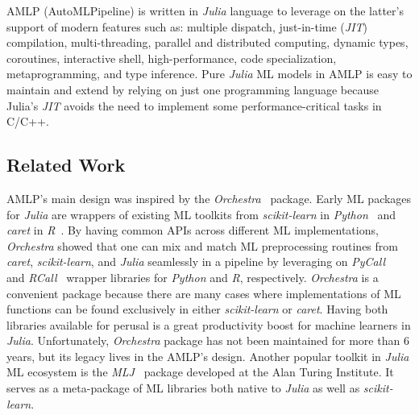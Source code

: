 \documentclass{juliacon}
\begin{document}
AMLP (AutoMLPipeline) is written in \emph{Julia} language \cite{bezanson2017julia} to leverage on the
latter's support of modern features such as: multiple dispatch, just-in-time
(\emph{JIT}) compilation, multi-threading, parallel and distributed computing,
dynamic types, coroutines, interactive shell, high-performance, code specialization,
metaprogramming, and type inference.  Pure \emph{Julia} ML models in AMLP is
easy to maintain and extend by relying on just one programming language
because Julia's \emph{JIT} avoids the need to implement some
performance-critical tasks in C/C++.

\subsection{Related Work}
\label{relatedwork}

AMLP's main design was inspired by the
\emph{Orchestra}~\cite{orchestra2014} package.  Early ML packages for
\emph{Julia} are wrappers of existing ML toolkits from \emph{scikit-learn}  in
\emph{Python}~\cite{python95} and \emph{caret} in \emph{R}~\cite{r13}.  By
having common APIs across different ML implementations, \emph{Orchestra} showed
that one can mix and match ML preprocessing routines from \emph{caret},
\emph{scikit-learn}, and \emph{Julia} seamlessly in a pipeline by leveraging on
\emph{PyCall}~\cite{pycall} and \emph{RCall}~\cite{rcall} wrapper libraries for
\emph{Python} and \emph{R}, respectively. \emph{Orchestra}  is a convenient package
because there are many cases where implementations of ML functions can be found
exclusively in either \emph{scikit-learn} or \emph{caret}.  Having both
libraries available for perusal is a great productivity boost for machine
learners in \emph{Julia}. Unfortunately, \emph{Orchestra} package has not been
maintained for more than 6 years, but its legacy lives in the AMLP's
design. Another popular toolkit in \emph{Julia} ML ecosystem is the
\emph{MLJ}~\cite{anthony_blaom_2019_3541506} package developed at the Alan Turing
Institute. It serves as a meta-package of ML libraries both native to \emph{Julia} as
well as \emph{scikit-learn}. 

\vskip 6pt
\end{document}
